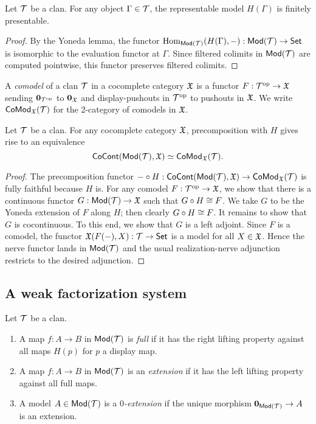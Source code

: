 \documentclass[a4paper]{article}
\begin{document}
\begin{lemma}
  Let $\mathcal{T}$ be a clan.
  For any object $\Gamma \in \mathcal{T}$, the representable model $H(\Gamma)$ is finitely presentable.
\end{lemma}
\begin{proof}
  By the Yoneda lemma, the functor $\operatorname{\mathrm{Hom}_{\mathsf{Mod}(\mathcal{T})}}(H(\Gamma),-) : \mathsf{Mod}(\mathcal{T}) \to \mathsf{Set}$ is isomorphic to the evaluation functor at $\Gamma$.
  Since filtered colimits in $\mathsf{Mod}(\mathcal{T})$ are computed pointwise, this functor preserves filtered colimits.
\end{proof}

\begin{definition} 
  A \emph{comodel} of a clan $\mathcal{T}$ in a cocomplete category $\mathfrak{X}$ is a functor $F : \mathcal{T}^{\mathrm{op}} \to \mathfrak{X}$ sending $\mathbf{0}_{\mathcal{T}^{\mathrm{op}}}$ to $\mathbf{0}_{\mathfrak{X}}$ and display-pushouts in $\mathcal{T}^{\mathrm{op}}$ to pushouts in $\mathfrak{X}$.
  We write $\mathsf{CoMod}_{\mathfrak{X}}(\mathcal{T})$ for the 2-category of comodels in $\mathfrak{X}$.
\end{definition}

\begin{proposition}
  Let $\mathcal{T}$ be a clan.
  For any cocomplete category $\mathfrak{X}$, precomposition with $H$ gives rise to an equivalence
  \[
    \mathsf{CoCont}(\mathsf{Mod}(\mathcal{T}),\mathfrak{X}) \simeq \mathsf{CoMod}_{\mathfrak{X}}(\mathcal{T}).
  \]
\end{proposition}
\begin{proof}
  The precomposition functor $- \circ H : \mathsf{CoCont}(\mathsf{Mod}(\mathcal{T}),\mathfrak{X}) \to \mathsf{CoMod}_{\mathfrak{X}}(\mathcal{T})$ is fully faithful because $H$ is.
  For any comodel $F : \mathcal{T}^{\mathrm{op}} \to \mathfrak{X}$, we show that there is a continuous functor $G : \mathsf{Mod}(\mathcal{T}) \to \mathfrak{X}$ such that $G \circ H \cong F$.
  We take $G$ to be the Yoneda extension of $F$ along $H$; then clearly $G \circ H \cong F$.
  It remains to show that $G$ is cocontinuous.
  To this end, we show that $G$ is a left adjoint.
  Since $F$ is a comodel, the functor $\mathfrak{X}(F(-),X) : \mathcal{T} \to \mathsf{Set}$ is a model for all $X \in \mathfrak{X}$.
  Hence the nerve functor lands in $\mathsf{Mod}(\mathcal{T})$ and the usual realization-nerve adjunction restricts to the desired adjunction.
\end{proof}

\subsection{A weak factorization system}
\begin{definition}
  Let $\mathcal{T}$ be a clan.
  \begin{enumerate}
  \item A map $f : A \to B$ in $\mathsf{Mod}(\mathcal{T})$ is \emph{full} if it has the right lifting property against all maps $H(p)$ for $p$ a display map.
  \item A map $f : A \to B$ in $\mathsf{Mod}(\mathcal{T})$ is an \emph{extension} if it has the left lifting property against all full maps.
  \item A model $A \in \mathsf{Mod}(\mathcal{T})$ is a \emph{$0$-extension} if the unique morphism $\mathbf{0}_{\mathsf{Mod}(\mathcal{T})} \to A$ is an extension.
  \end{enumerate}
\end{definition}
\end{document}
